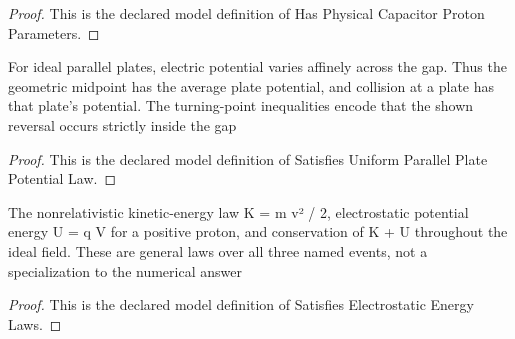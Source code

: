 \begin{proof}
  This is the declared model definition of Has Physical Capacitor Proton Parameters.
\end{proof}
\begin{definition}
  \label{def:physics:phyx-mini-0866:phyxminiproblems-problemphyxmini0866-satisfiesuniformparallelplatepotentiallaw}
  For ideal parallel plates, electric potential varies affinely across the gap. Thus the geometric midpoint has the average plate potential, and collision at a plate has that plate's potential. The turning-point inequalities encode that the shown reversal occurs strictly inside the gap
\end{definition}
\begin{proof}
  This is the declared model definition of Satisfies Uniform Parallel Plate Potential Law.
\end{proof}
\begin{definition}
  \label{def:physics:phyx-mini-0866:phyxminiproblems-problemphyxmini0866-satisfieselectrostaticenergylaws}
  The nonrelativistic kinetic-energy law K = m v² / 2, electrostatic potential energy U = q V for a positive proton, and conservation of K + U throughout the ideal field. These are general laws over all three named events, not a specialization to the numerical answer
\end{definition}
\begin{proof}
  This is the declared model definition of Satisfies Electrostatic Energy Laws.
\end{proof}
